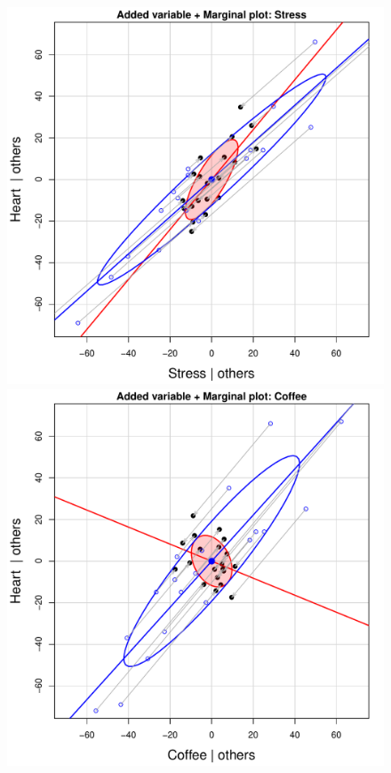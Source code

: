 \begin{figure}[htb]
 \begin{minipage}[b]{.49\linewidth}
  \centering
  \includegraphics[width=1\linewidth]{fig/coffee-avplot3}
 \end{minipage}%
 \hfill
 \begin{minipage}[b]{.49\linewidth}
  \centering
  \includegraphics[width=1\linewidth]{fig/coffee-avplot4}

\end{minipage}
\end{figure}
